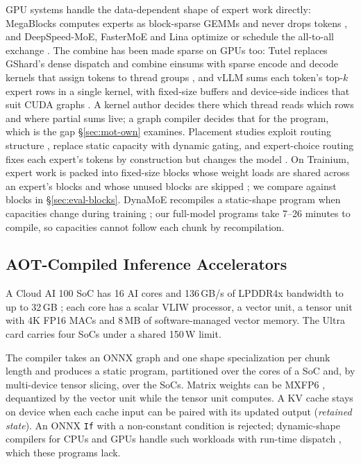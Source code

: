 GPU systems handle the data-dependent shape of expert work directly: MegaBlocks computes experts as block-sparse GEMMs
and never drops tokens \citep{gale2023megablocks}, and DeepSpeed-MoE, FasterMoE and Lina optimize or schedule the
all-to-all exchange \citep{rajbhandari2022deepspeedmoe,he2022fastermoe,li2023lina}. The combine has been made sparse on
GPUs too: Tutel replaces GShard's dense dispatch and combine einsums with sparse encode and decode kernels that assign
tokens to thread groups \citep{hwang2023tutel}, and vLLM sums each token's top-$k$
expert rows in a single kernel, with fixed-size buffers and device-side indices that suit CUDA graphs
\citep{vllmmoe,megatronfusedmoe}. A kernel author decides there which thread reads which rows and where partial sums live;
a graph compiler decides that for the program, which is the gap \S\ref{sec:mot-own} examines. Placement studies exploit routing structure
\citep{yao2024exflow,yu2025patterns}, \citet{huang2024toward} replace static capacity with dynamic gating, and
expert-choice routing fixes each expert's tokens by construction but changes the model \citep{zhou2022expertchoice}. On
Trainium, expert work is packed into fixed-size blocks whose weight loads are shared across an expert's blocks and whose
unused blocks are skipped \citep{awsneuronmoe}; we compare against blocks in \S\ref{sec:eval-blocks}. DynaMoE recompiles a
static-shape program when capacities change during training \citep{kossmann2022dynamoe}; our full-model programs take
7--26 minutes to compile, so capacities cannot follow each chunk by recompilation.

\subsection{AOT-Compiled Inference Accelerators}

A Cloud AI 100 SoC has 16 AI cores and 136\,GB/s of LPDDR4x bandwidth to up to 32\,GB
\citep{chatha2021qualcomm,qualcomm2025arch}; each core has a scalar VLIW processor, a vector unit, a tensor unit with 4K
FP16 MACs and 8\,MB of software-managed vector memory. The Ultra card carries four SoCs under a shared 150\,W limit.

The compiler takes an ONNX graph and one shape specialization per chunk length and produces a static program,
partitioned over the cores of a SoC and, by multi-device tensor slicing, over the SoCs. Matrix weights can be MXFP6
\citep{rouhani2023mx}, dequantized by the vector unit while the tensor unit computes. A KV cache stays on device when each
cache input can be paired with its updated output (\emph{retained state}). An ONNX \texttt{If} with a non-constant
condition is rejected; dynamic-shape compilers for CPUs and GPUs handle such workloads with run-time dispatch
\citep{shen2021nimble,zhu2021disc}, which these programs lack.
